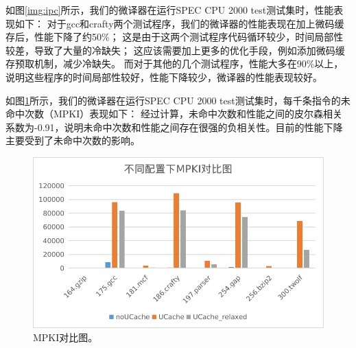 如图\ref{img:ipc}所示，我们的微译器在运行SPEC CPU 2000 test测试集时，性能表现如下：
对于gcc和crafty两个测试程序，我们的微译器的性能表现在加上微码缓存后，性能下降了约50\%；
这是由于这两个测试程序代码循环较少，时间局部性较差，导致了大量的冷缺失；
这应该需要加上更多的优化手段，例如添加微码缓存预取机制，减少冷缺失。
而对于其他的几个测试程序，性能大多在90\%以上，说明这些程序的时间局部性较好，性能下降较少，微译器的性能表现较好。

如图\ref{img:MPKI}所示，我们的微译器在运行SPEC CPU 2000 test测试集时，每千条指令的未命中次数（MPKI）表现如下：
经过计算，未命中次数和性能之间的皮尔森相关系数为-0.91，说明未命中次数和性能之间存在很强的负相关性。目前的性能下降主要受到了未命中次数的影响。

\begin{figure}[!htbp]
  \centering
  \includegraphics[width=0.8\linewidth]{./plot/MPKI.png}
  \caption{MPKI对比图。}
  \label{img:MPKI}
\end{figure}
